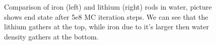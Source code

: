 \begin{figure}
\begin{minipage}[t]{0.45\textwidth}
  \end{minipage}
  \caption{Comparison of iron (left) and lithium (right) rods in water, picture shows end state after 5e8 MC iteration steps. We can see that the lithium gathers at the top, while iron due to it's larger then water density gathers at the bottom.}
  \label{fig:med_comp1}
\end{figure}
